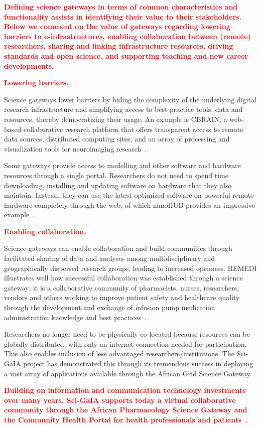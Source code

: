 \documentclass[review]{elsarticle}
\newcommand{\changedtext}[1]{
	\textcolor{red}{\textbf{#1}}
}
\begin{document}
\changedtext{Defining science gateways in terms of common characteristics and functionality assists in identifying their value to their stakeholders. Below we comment on the value of gateways regarding lowering barriers to e-infrastructures, enabling collaboration between (remote) researchers, sharing and linking infrastructure resources, driving standards and open science, and supporting teaching and new career developments.  }


\changedtext{\textbf{Lowering barriers.}}
Science gateways lower barriers by hiding the complexity of the underlying digital research infrastructure and simplifying access to best-practice tools, data and resources, thereby democratizing their usage. 
An example is CBRAIN, a web-based collaborative research platform that offers transparent access to remote data sources, distributed computing sites, and an array of processing and visualization tools for neuroimaging research~\cite{cbrain-70}. 

Some  gateways provide access to  modelling and other software and hardware resources through a single portal. Researchers do not need to spend time downloading, installing and updating software on hardware that they also maintain. 
Instead, they can use the latest optimized software on powerful remote hardware completely through the web, of which nanoHUB provides an impressive example~\cite{nanohub-33}. 

\changedtext{\textbf{Enabling collaboration.}}
Science gateways can enable collaboration and build communities through facilitated sharing of data and analyses among multidisciplinary and geographically dispersed research groups, leading to increased openness. REMEDI illustrates well  how successful collaboration was established through a science gateway: it is a collaborative community of pharmacists, nurses, researchers, vendors and others working to improve patient safety and healthcare quality through the development and exchange of infusion pump medication administration knowledge and best practices~\cite{remedi-71}.  

Researchers no longer need to be physically co-located because resources can be globally distributed, with only an internet connection needed for participation. This also enables inclusion of less advantaged researchers/institutions. 
The Sci-GaIA project has demonstrated this through its tremendous success in deploying a vast array of applications available through the African Grid Science Gateway. 
\changedtext{Building on information and communication technology investments over many years, Sci-GaIA supports today a virtual collaborative community through the African Pharmacology Science Gateway and the Community Health Portal for health professionals and patients~\cite{sci-gaia-22}. }
\end{document}
